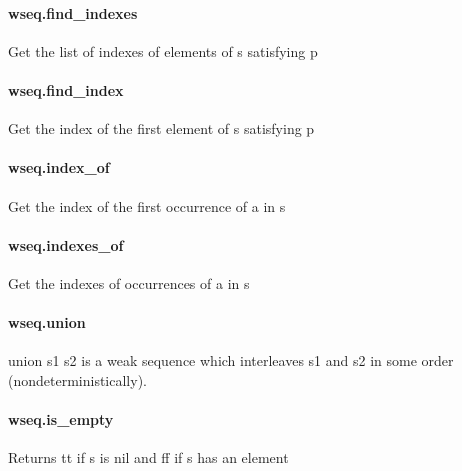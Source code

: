 \documentclass{article}
\begin{document}
\paragraph{wseq.find\_indexes}
\par
Get the list of indexes of elements of 
\colorbox[RGB]{253,246,227}{{{{\color[RGB]{101, 123, 131} s }}}} satisfying 
\colorbox[RGB]{253,246,227}{{{{\color[RGB]{101, 123, 131} p }}}}\paragraph{wseq.find\_index}
\par
Get the index of the first element of 
\colorbox[RGB]{253,246,227}{{{{\color[RGB]{101, 123, 131} s }}}} satisfying 
\colorbox[RGB]{253,246,227}{{{{\color[RGB]{101, 123, 131} p }}}}\paragraph{wseq.index\_of}
\par
Get the index of the first occurrence of 
\colorbox[RGB]{253,246,227}{{{{\color[RGB]{101, 123, 131} a }}}} in 
\colorbox[RGB]{253,246,227}{{{{\color[RGB]{101, 123, 131} s }}}}\paragraph{wseq.indexes\_of}
\par
Get the indexes of occurrences of 
\colorbox[RGB]{253,246,227}{{{{\color[RGB]{101, 123, 131} a }}}} in 
\colorbox[RGB]{253,246,227}{{{{\color[RGB]{101, 123, 131} s }}}}\paragraph{wseq.union}
\par
\colorbox[RGB]{253,246,227}{{{{\color[RGB]{101, 123, 131} union s1 s2 }}}} is a weak sequence which interleaves 
\colorbox[RGB]{253,246,227}{{{{\color[RGB]{101, 123, 131} s1 }}}} and 
\colorbox[RGB]{253,246,227}{{{{\color[RGB]{101, 123, 131} s2 }}}} in
some order (nondeterministically).
\paragraph{wseq.is\_empty}
\par
Returns 
\colorbox[RGB]{253,246,227}{{{{\color[RGB]{101, 123, 131} tt }}}} if 
\colorbox[RGB]{253,246,227}{{{{\color[RGB]{101, 123, 131} s }}}} is 
\colorbox[RGB]{253,246,227}{{{{\color[RGB]{101, 123, 131} nil }}}} and 
\colorbox[RGB]{253,246,227}{{{{\color[RGB]{101, 123, 131} ff }}}} if 
\colorbox[RGB]{253,246,227}{{{{\color[RGB]{101, 123, 131} s }}}} has an element
\end{document}
